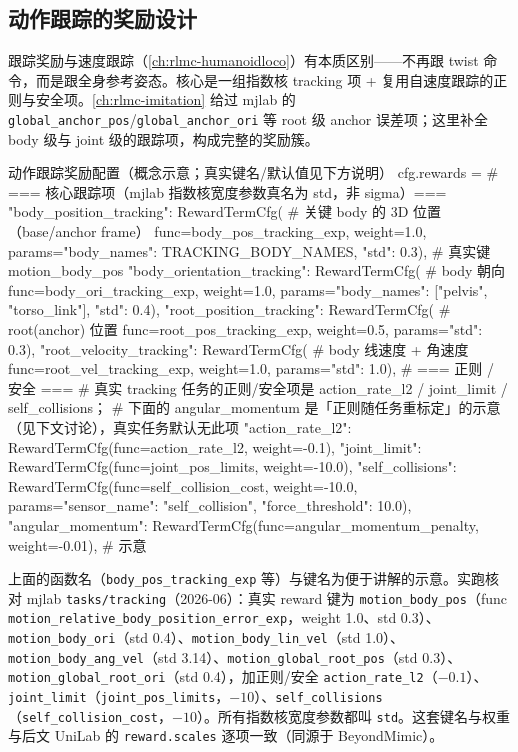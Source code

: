 \subsection{动作跟踪的奖励设计}
\label{sec:rlmc-mi-mjlab-reward}

跟踪奖励与速度跟踪（\cref{ch:rlmc-humanoidloco}）有本质区别——不再跟 twist 命令，而是跟全身参考姿态。核心是一组指数核 tracking 项 + 复用自速度跟踪的正则与安全项。\cref{ch:rlmc-imitation} 给过 mjlab 的 \verb|global_anchor_pos|/\verb|global_anchor_ori| 等 root 级 anchor 误差项；这里补全 body 级与 joint 级的跟踪项，构成完整的奖励簇。

\begin{codebox}[Python]{动作跟踪奖励配置（概念示意；真实键名/默认值见下方说明）}
cfg.rewards = {
    # === 核心跟踪项（mjlab 指数核宽度参数真名为 std，非 sigma）===
    "body_position_tracking":  RewardTermCfg(   # 关键 body 的 3D 位置（base/anchor frame）
        func=body_pos_tracking_exp, weight=1.0,
        params={"body_names": TRACKING_BODY_NAMES, "std": 0.3}),     # 真实键 motion_body_pos
    "body_orientation_tracking": RewardTermCfg( # body 朝向
        func=body_ori_tracking_exp, weight=1.0,
        params={"body_names": ["pelvis", "torso_link"], "std": 0.4}),
    "root_position_tracking":  RewardTermCfg(   # root(anchor) 位置
        func=root_pos_tracking_exp, weight=0.5, params={"std": 0.3}),
    "root_velocity_tracking":  RewardTermCfg(   # body 线速度 + 角速度
        func=root_vel_tracking_exp, weight=1.0, params={"std": 1.0}),
    # === 正则 / 安全 ===
    # 真实 tracking 任务的正则/安全项是 action_rate_l2 / joint_limit / self_collisions；
    # 下面的 angular_momentum 是「正则随任务重标定」的示意（见下文讨论），真实任务默认无此项
    "action_rate_l2":   RewardTermCfg(func=action_rate_l2, weight=-0.1),
    "joint_limit":      RewardTermCfg(func=joint_pos_limits, weight=-10.0),
    "self_collisions":  RewardTermCfg(func=self_collision_cost, weight=-10.0,
        params={"sensor_name": "self_collision", "force_threshold": 10.0}),
    "angular_momentum": RewardTermCfg(func=angular_momentum_penalty, weight=-0.01),  # 示意
}
\end{codebox}

\begin{note}
上面的函数名（\texttt{body\_pos\_tracking\_exp} 等）与键名为便于讲解的示意。实跑核对 mjlab \verb|tasks/tracking|（2026-06）：真实 reward 键为 \verb|motion_body_pos|（func \verb|motion_relative_body_position_error_exp|，weight 1.0、std 0.3）、\verb|motion_body_ori|（std 0.4）、\verb|motion_body_lin_vel|（std 1.0）、\verb|motion_body_ang_vel|（std 3.14）、\verb|motion_global_root_pos|（std 0.3）、\verb|motion_global_root_ori|（std 0.4），加正则/安全 \verb|action_rate_l2|（$-0.1$）、\verb|joint_limit|（\verb|joint_pos_limits|，$-10$）、\verb|self_collisions|（\verb|self_collision_cost|，$-10$）。所有指数核宽度参数都叫 \verb|std|。这套键名与权重与后文 UniLab 的 \verb|reward.scales| 逐项一致（同源于 BeyondMimic）。
\end{note}

